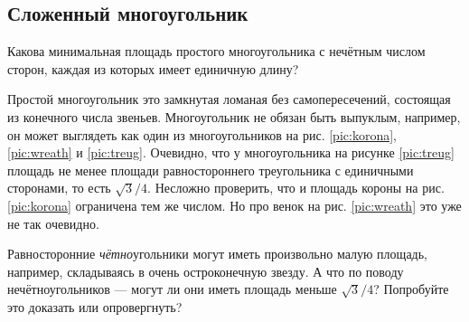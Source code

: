 \subsection*{Сложенный многоугольник}\label{Сложенный многоугольник}

Какова минимальная площадь простого многоугольника с нечётным числом сторон, каждая из которых имеет единичную длину?

Простой многоугольник это замкнутая ломаная без самопересечений, состоящая из конечного числа звеньев.
Многоугольник не обязан быть выпуклым,
например, он может выглядеть как один из многоугольников на рис. \ref{pic:korona},
\ref{pic:wreath} и \ref{pic:treug}.
Очевидно, что у многоугольника на рисунке \ref{pic:treug} площадь не менее площади равностороннего треугольника с единичными сторонами, то есть $\sqrt{3}/4$.
Несложно проверить, что и площадь короны на рис. \ref{pic:korona} ограничена тем же числом.
Но про венок на рис. \ref{pic:wreath} это уже не так очевидно.

Равносторонние \emph{чётно}угольники могут иметь произвольно малую площадь, например, складываясь в очень остроконечную звезду.
А что по поводу нечётноугольников --- могут ли они иметь площадь меньше $\sqrt{3}/4$?
Попробуйте это доказать или опровергнуть?

